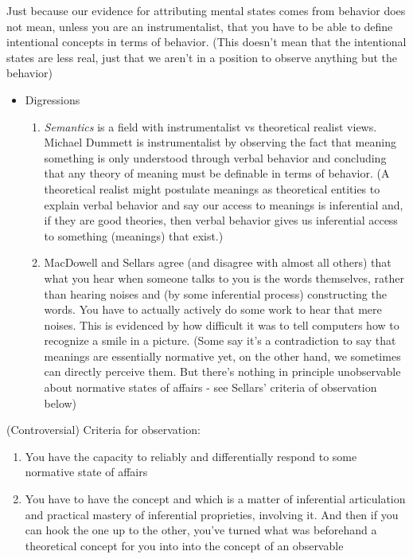 Just because our evidence for attributing mental states comes from behavior does not mean, unless you are an instrumentalist, that you have to be able to define intentional concepts in terms of behavior. (This doesn't mean that the intentional states are less real, just that we aren't in a position to observe anything but the behavior)
\begin{itemize}
\item  Digressions
\begin{enumerate}
\item \emph{Semantics} is a field with instrumentalist vs theoretical realist views. Michael Dummett is instrumentalist by observing the fact that meaning something is only understood through verbal behavior and concluding that any theory of meaning must be definable in terms of behavior. (A theoretical realist might postulate meanings as theoretical entities to explain verbal behavior and say our access to meanings is inferential and, if they are good theories, then verbal behavior gives us inferential access to something (meanings) that exist.)
\item MacDowell and Sellars agree (and disagree with almost all others) that what you hear when someone talks to you is the words themselves, rather than hearing noises and (by some inferential process) constructing the words. You have to actually actively do some work to hear that mere noises. This is evidenced by how difficult it was to tell computers how to recognize a smile in a picture. (Some say it's a contradiction to say that meanings are essentially normative yet, on the other hand, we sometimes can directly perceive them. But there's nothing in principle unobservable about normative states of affairs - see Sellars' criteria of observation below)
\end{enumerate}
\end{itemize}

(Controversial) Criteria for observation:
\begin{enumerate}
\item You have the capacity to reliably and differentially respond to some normative state of affairs
\item You have to have the concept and which is a matter of inferential articulation and practical mastery of inferential proprieties, involving it. And then if you can hook the one up to the other, you've turned what was beforehand a theoretical concept for you into into the concept of an observable
\end{enumerate}

